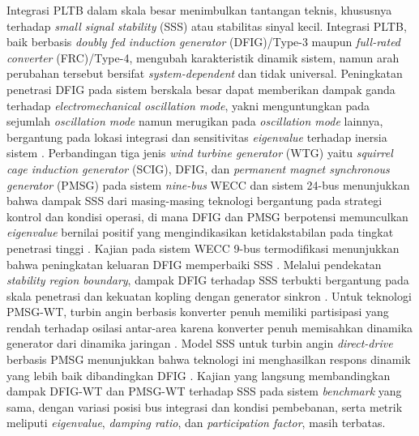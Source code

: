 Integrasi PLTB dalam skala besar menimbulkan tantangan teknis, khususnya terhadap
\textit{small signal stability} (SSS) atau stabilitas sinyal kecil. Integrasi
PLTB, baik berbasis \textit{doubly fed induction generator} (DFIG)/Type-3 maupun
\textit{full-rated converter} (FRC)/Type-4, mengubah karakteristik dinamik sistem,
namun arah perubahan tersebut bersifat \textit{system-dependent} dan tidak universal. Peningkatan penetrasi DFIG pada sistem berskala besar dapat memberikan dampak
ganda terhadap \textit{electromechanical oscillation mode}, yakni menguntungkan
pada sejumlah \textit{oscillation mode} namun merugikan pada
\textit{oscillation mode} lainnya, bergantung pada lokasi integrasi dan
sensitivitas \textit{eigenvalue} terhadap inersia sistem \cite{gautam2009impact}. Perbandingan tiga jenis \textit{wind turbine generator} (WTG) yaitu
\textit{squirrel cage induction generator} (SCIG), DFIG, dan \textit{permanent
magnet synchronous generator} (PMSG) pada sistem \textit{nine-bus} WECC dan
sistem 24-bus menunjukkan bahwa dampak SSS dari masing-masing teknologi
bergantung pada strategi kontrol dan kondisi operasi, di mana DFIG dan PMSG
berpotensi memunculkan \textit{eigenvalue} bernilai positif yang
mengindikasikan ketidakstabilan pada tingkat penetrasi tinggi
\cite{he2015investigation}. Kajian pada sistem WECC 9-bus termodifikasi menunjukkan bahwa peningkatan
keluaran DFIG memperbaiki SSS \cite{sun2013small}. Melalui pendekatan
\textit{stability region boundary}, dampak DFIG terhadap SSS terbukti bergantung
pada skala penetrasi dan kekuatan kopling dengan generator sinkron
\cite{liu2014impact}. Untuk teknologi PMSG-WT, turbin angin berbasis konverter penuh memiliki
partisipasi yang rendah terhadap osilasi antar-area karena konverter penuh
memisahkan dinamika generator dari dinamika jaringan \cite{knuppel2009small}.
Model SSS untuk turbin angin \textit{direct-drive} berbasis PMSG menunjukkan
bahwa teknologi ini menghasilkan respons dinamik yang lebih baik dibandingkan
DFIG \cite{wu2009small}. Kajian yang langsung membandingkan dampak DFIG-WT
dan PMSG-WT terhadap SSS pada sistem \textit{benchmark} yang sama, dengan
variasi posisi bus integrasi dan kondisi pembebanan, serta metrik meliputi
\textit{eigenvalue}, \textit{damping ratio}, dan \textit{participation factor},
masih terbatas.

